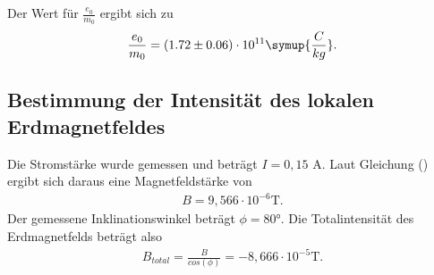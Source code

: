 Der Wert für $\frac{e_0}{m_0}$ ergibt sich zu
\begin{align*}
\frac{e_0}{m_0} = (1.72 \pm 0.06) \cdot 10^{11} \symup{\frac{C}{kg}}.
\end{align*}


\subsection{Bestimmung der Intensität des lokalen Erdmagnetfeldes}
Die Stromstärke wurde gemessen und beträgt $I = 0,15$ \si{\ampere}.
Laut Gleichung () ergibt sich daraus eine Magnetfeldstärke von
\begin{align*}
    B = 9,566 \cdot 10^{-6} \si{\tesla}.
\end{align*}
Der gemessene Inklinationswinkel beträgt $\phi = 80°$.
Die Totalintensität des Erdmagnetfelds beträgt also
\begin{align*}
    B_{total} = \frac{B}{cos(\phi)} = -8,666 \cdot 10^{-5} \si{\tesla}.
\end{align*}
